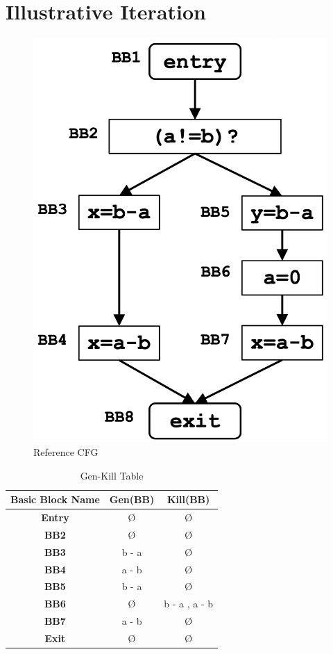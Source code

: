\documentclass[a4paper,12pt,numbers=noenddot]{scrreprt}
\begin{document}
    \section*{Illustrative Iteration}

        \vspace{1cm}
    
        \begin{figure}[H]
            \centering
            \includegraphics[width=0.3\linewidth]{assets/vbe.png}
            \caption{Reference CFG}
            \label{fig:vbe_iteration_image}
        \end{figure}

        \vspace{1cm}

        \begin{table}[H]
            \centering
            \begin{tabular}{|c|c|c|}
                \hline
                \textbf{Basic Block Name} & \textbf{Gen(BB)} & \textbf{Kill(BB)} \\
                \hline
                \textbf{Entry} & Ø & Ø \\
                \textbf{BB2} & Ø & Ø \\
                \textbf{BB3} & b - a & Ø \\
                \textbf{BB4} & a - b & Ø \\
                \textbf{BB5} & b - a & Ø \\
                \textbf{BB6} & Ø & b - a , a - b\\
                \textbf{BB7} & a - b & Ø \\
                \textbf{Exit}  & Ø & Ø \\
                \hline
            \end{tabular}
            \caption{Gen-Kill Table}
            \label{tab:vbe_gen_kill_table}
        \end{table}
\end{document}
